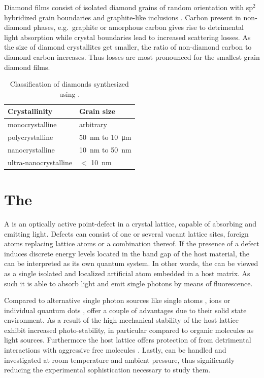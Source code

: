     Diamond films consist of isolated diamond grains of random orientation with sp$^2$ hybridized grain boundaries and graphite-like inclusions \cite{Riedrich-moller2014}. Carbon present in non-diamond phases, e.g.\ graphite or amorphous carbon gives rise to detrimental light absorption while crystal boundaries lead to increased scattering losses. As the size of diamond crystallites get smaller, the ratio of non-diamond carbon to diamond carbon increases. Thus losses are most pronounced for the smallest grain diamond films. 

    \begin{table}[htbp]
        \centering
  			\begin{tabular}{@{} ll @{}}
  			\toprule
  			Crystallinity & Grain size  \\
  			\midrule
  			monocrystalline & arbitrary \\
  			polycrystalline & \SI{50}{\nm} to \SI{10}{\micro\meter} \\
  			nanocrystalline & \SI{10}{\nm} to \SI{50}{\nm} \\
  			ultra-nanocrystalline & $<$ \SI{10}{\nm} \\
  			\bottomrule
  			\end{tabular}
        \caption[Classification of diamond synthesized by \cvd]{Classification of diamonds synthesized using \CVD \cite{Steinmetz2011}.} \label{tab::diamond_grain_sizes}
  	\end{table}

\section{The \Sivc} \label{sec::siv}

  A \cc is an optically active point-defect in a crystal lattice, capable of absorbing and emitting light. Defects can consist of one or several vacant lattice sites, foreign atoms replacing lattice atoms or a combination thereof. If the presence of a defect induces discrete energy levels located in the band gap of the host material, the \cc can be interpreted as its own quantum system. In other words, the \cc can be viewed as a single isolated and localized artificial atom embedded in a host matrix. As such it is able to absorb light and emit single photons by means of fluorescence.

  Compared to alternative single photon sources like single atoms \cite{Kuhn2002}, ions \cite{Keller2004} or individual quantum dots \cite{Michler2000, Yuan2002}, \ccs offer a couple of advantages due to their solid state environment. As a result of the high mechanical stability of the host lattice \ccs exhibit increased photo-stability, in particular compared to organic molecules as light sources. Furthermore the host lattice offers protection of \ccs from detrimental interactions with aggressive free molecules \cite{Lounis2005}. Lastly, \ccs can be handled and investigated at room temperature and ambient pressure, thus significantly reducing the experimental sophistication necessary to study them.

